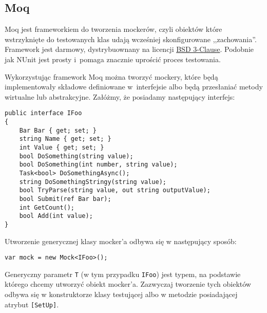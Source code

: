 \subsection{Moq}
Moq jest frameworkiem do tworzenia mockerów, czyli obiektów które wstrzyknięte do testowanych klas udają wcześniej skonfigurowane ,,zachowania''. Framework jest darmowy, dystrybuownany na licencji \href{https://opensource.org/licenses/BSD-3-Clause}{BSD 3-Clause}. Podobnie jak NUnit jest prosty i~pomaga znacznie uprościć proces testowania.




Wykorzystując framework Moq można tworzyć mockery, które będą implementowały składowe definiowane w~interfejsie albo będą przesłaniać metody wirtualne lub abstrakcyjne. Załóżmy, że posiadamy następujący interfejs:
\begin{lstlisting}
public interface IFoo
{
	Bar Bar { get; set; }
	string Name { get; set; }
	int Value { get; set; }
	bool DoSomething(string value);
	bool DoSomething(int number, string value);
	Task<bool> DoSomethingAsync();
	string DoSomethingStringy(string value);
	bool TryParse(string value, out string outputValue);
	bool Submit(ref Bar bar);
	int GetCount();
	bool Add(int value);
}
\end{lstlisting}
Utworzenie generycznej klasy mocker'a odbywa się w następujący sposób:
\begin{lstlisting}
var mock = new Mock<IFoo>();
\end{lstlisting}
Generyczny parametr \texttt{T} (w tym przypadku \texttt{IFoo}) jest typem, na podstawie którego chcemy utworzyć obiekt mocker'a. Zazwyczaj tworzenie tych obiektów odbywa się w konstruktorze klasy testującej albo w metodzie posiadającej atrybut \texttt{[SetUp]}.

